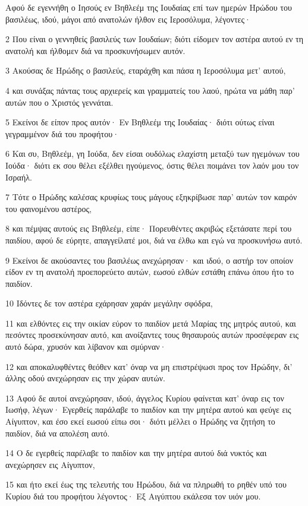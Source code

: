 \par Αφού δε εγεννήθη ο Ιησούς εν Βηθλεέμ της Ιουδαίας επί των ημερών Ηρώδου του βασιλέως, ιδού, μάγοι από ανατολών ήλθον εις Ιεροσόλυμα, λέγοντες·
\par 2 Που είναι ο γεννηθείς βασιλεύς των Ιουδαίων; διότι είδομεν τον αστέρα αυτού εν τη ανατολή και ήλθομεν διά να προσκυνήσωμεν αυτόν.
\par 3 Ακούσας δε Ηρώδης ο βασιλεύς, εταράχθη και πάσα η Ιεροσόλυμα μετ' αυτού,
\par 4 και συνάξας πάντας τους αρχιερείς και γραμματείς του λαού, ηρώτα να μάθη παρ' αυτών που ο Χριστός γεννάται.
\par 5 Εκείνοι δε είπον προς αυτόν· Εν Βηθλεέμ της Ιουδαίας· διότι ούτως είναι γεγραμμένον διά του προφήτου·
\par 6 Και συ, Βηθλεέμ, γη Ιούδα, δεν είσαι ουδόλως ελαχίστη μεταξύ των ηγεμόνων του Ιούδα· διότι εκ σου θέλει εξέλθει ηγούμενος, όστις θέλει ποιμάνει τον λαόν μου τον Ισραήλ.
\par 7 Τότε ο Ηρώδης καλέσας κρυφίως τους μάγους εξηκρίβωσε παρ' αυτών τον καιρόν του φαινομένου αστέρος,
\par 8 και πέμψας αυτούς εις Βηθλεέμ, είπε· Πορευθέντες ακριβώς εξετάσατε περί του παιδίου, αφού δε εύρητε, απαγγείλατέ μοι, διά να έλθω και εγώ να προσκυνήσω αυτό.
\par 9 Εκείνοι δε ακούσαντες του βασιλέως ανεχώρησαν· και ιδού, ο αστήρ τον οποίον είδον εν τη ανατολή προεπορεύετο αυτών, εωσού ελθών εστάθη επάνω όπου ήτο το παιδίον.
\par 10 Ιδόντες δε τον αστέρα εχάρησαν χαράν μεγάλην σφόδρα,
\par 11 και ελθόντες εις την οικίαν εύρον το παιδίον μετά Μαρίας της μητρός αυτού, και πεσόντες προσεκύνησαν αυτό, και ανοίξαντες τους θησαυρούς αυτών προσέφεραν εις αυτό δώρα, χρυσόν και λίβανον και σμύρναν·
\par 12 και αποκαλυφθέντες θεόθεν κατ' όναρ να μη επιστρέψωσι προς τον Ηρώδην, δι' άλλης οδού ανεχώρησαν εις την χώραν αυτών.
\par 13 Αφού δε αυτοί ανεχώρησαν, ιδού, άγγελος Κυρίου φαίνεται κατ' όναρ εις τον Ιωσήφ, λέγων· Εγερθείς παράλαβε το παιδίον και την μητέρα αυτού και φεύγε εις Αίγυπτον, και έσο εκεί εωσού είπω σοι· διότι μέλλει ο Ηρώδης να ζητήση το παιδίον, διά να απολέση αυτό.
\par 14 Ο δε εγερθείς παρέλαβε το παιδίον και την μητέρα αυτού διά νυκτός και ανεχώρησεν εις Αίγυπτον,
\par 15 και ήτο εκεί έως της τελευτής του Ηρώδου, διά να πληρωθή το ρηθέν υπό του Κυρίου διά του προφήτου λέγοντος· Εξ Αιγύπτου εκάλεσα τον υιόν μου.
